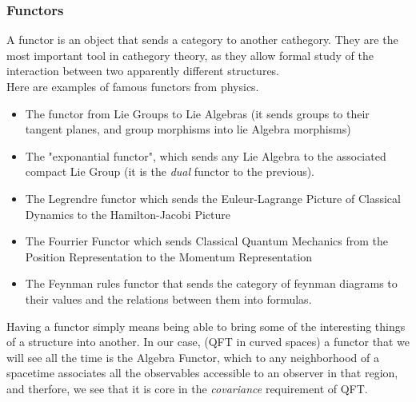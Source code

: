 \documentclass[a4paper,11pt]{article}
\numberwithin{equation}{section}
\theoremstyle{definition}
\begin{document}
    \subsubsection{Functors}
    A functor is an object that sends a category to another cathegory. They are the most important tool in cathegory theory, as they allow formal study of the interaction between two apparently different structures.\\
    Here are examples of famous functors from physics.
    \begin{itemize}
        \item The functor from Lie Groups to Lie Algebras (it sends groups to their tangent planes, and group morphisms into lie Algebra morphisms)
        \item  The "exponantial functor", which sends any Lie Algebra to the associated compact Lie Group (it is the \emph{dual} functor to the previous).
        \item The Legrendre functor which sends the Euleur-Lagrange Picture of Classical Dynamics to the Hamilton-Jacobi Picture
        \item The Fourrier Functor which sends Classical Quantum Mechanics from the Position Representation to the Momentum Representation
        \item The Feynman rules functor that sends the category of feynman diagrams to their values and the relations between them into formulas.
    \end{itemize}
    Having a functor simply means being able to bring some of the interesting things of a structure into another. In our case, (QFT in curved spaces) a functor that we will see all the time is the Algebra Functor, which to any neighborhood of a spacetime associates all the observables accessible to an observer in that region, and therfore, we see that it is core in the \emph{covariance} requirement of QFT.
\end{document}
